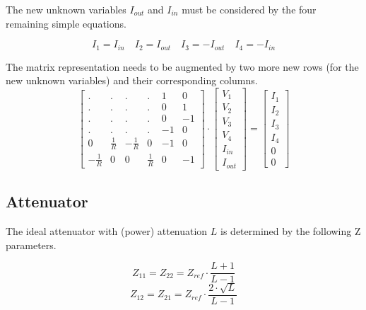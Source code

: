 \documentclass[10pt]{report}
\begin{document}
The new unknown variables $I_{out}$ and $I_{in}$ must be considered by
the four remaining simple equations.

\begin{equation}
I_{1} = I_{in} \quad I_{2} = I_{out} \quad I_{3} = -I_{out} \quad I_{4} = -I_{in}
\end{equation}

The matrix representation needs to be augmented by two more new rows
(for the new unknown variables) and their corresponding columns.
\begin{equation}
\begin{bmatrix}
.&.&.&.& 1 & 0\\
.&.&.&.& 0 & 1\\
.&.&.&.& 0 & -1\\
.&.&.&.& -1 & 0\\
0 & \frac{1}{R} & -\frac{1}{R} & 0 & -1 & 0\\
-\frac{1}{R} & 0 & 0 & \frac{1}{R} & 0 & -1
\end{bmatrix}
\cdot
\begin{bmatrix}
V_{1}\\
V_{2}\\
V_{3}\\
V_{4}\\
I_{in}\\
I_{out}
\end{bmatrix}
=
\begin{bmatrix}
I_{1}\\
I_{2}\\
I_{3}\\
I_{4}\\
0\\
0
\end{bmatrix}
\end{equation}

\subsection{Attenuator}

The ideal attenuator with (power) attenuation $L$ is determined by the
following Z parameters.

\begin{equation}
Z_{11} = Z_{22} = Z_{ref}\cdot\frac{L+1}{L-1}
\end{equation}
\begin{equation}
Z_{12} = Z_{21} = Z_{ref}\cdot\frac{2\cdot\sqrt{L}}{L-1}
\end{equation}
\end{document}
